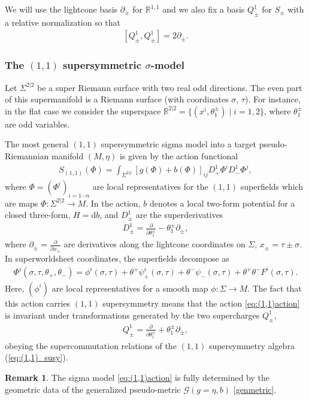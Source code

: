 \documentclass[letterpaper,12pt]{article}
\newcommand{\GG}{\mathcal{G}}
\newcommand{\RR}{\mathbb{R}}
\newcommand{\p}{\partial}
\newcommand{\rd}{\mathrm{d}}
\theoremstyle{definition}
\newtheorem{remark}[theorem]{Remark}
\theoremstyle{remark}
\theoremstyle{examples}
\begin{document}
We will use the lightcone basis $\p_{\pm}$ for $\RR^{1,1}$ and we also fix a basis $Q_\pm^1$ for $S_{\pm}$ with a relative normalization so that
\begin{align}\label{eq:(1,1)_susy}
[Q^1_\pm,Q^1_\pm] = 2\p_\pm.
\end{align}

\subsubsection{The $(1,1)$ supersymmetric $\sigma$-model} 

Let $\Sigma^{2|2}$ be a super Riemann surface with two real odd directions. 
The even part of this supermanifold is a Riemann surface (with coordinates $\sigma$, $\tau$).
For instance, in the flat case we consider the superspace $\RR^{2|2} = \{(x^i , \theta_1^{\pm}) \; | \; i = 1,2\}$, where $\theta_1^{\pm}$ are odd variables. 

The most general $(1,1)$ supersymmetric sigma model into a target pseudo-Riemannian manifold $(M,\eta)$ is given by the action functional
\begin{align}\label{eq:(1,1)action}
S_{(1,1)}(\Phi)=\int_{\Sigma^{2|2}} [g(\Phi)+b(\Phi)]_{ij}D^1_+\Phi^iD^1_-\Phi^j,
\end{align}
where $\Phi=(\Phi^i)_{i=1\cdots n}$ are local representatives for the $(1,1)$ {superfields} which are maps $\Phi: \Sigma^{2|2} \rightarrow M$.
In the action, $b$ denotes a local two-form potential for a closed three-form, $H=\rd b$, and $D^1_\pm$ are the superderivatives
\begin{align}\label{eq:D1}
D^1_\pm=\frac{\p}{\p \theta_1^\pm}-\theta_1^\pm \p_\pm,
\end{align}
where $\p_\pm=\frac{\p}{\p x_\pm}$ are derivatives along the lightcone coordinates on $\Sigma$, $x_\pm=\tau\pm\sigma$. In superworldsheet coordinates, the superfields decompose as
\begin{align}\label{fields_(1,1)}
\Phi^i(\sigma,\tau,\theta_+,\theta_-)=\phi^i(\sigma,\tau)+\theta^+\psi^i_+(\sigma,\tau)+\theta^-\psi_-(\sigma,\tau)+\theta^+\theta^-F^i(\sigma,\tau).
\end{align}
Here, $(\phi^i)$ are local representatives for a smooth map $\phi: \Sigma \rightarrow M$. The fact that this action carries $(1,1)$ supersymmetry means that the action \eqref{eq:(1,1)action} is invariant under transformations generated by the two {supercharges} $Q^1_\pm$, 
\begin{align}\label{eq:Q1}
Q^1_\pm=\frac{\p}{\p \theta_1^\pm}+\theta_1^\pm \p_\pm,
\end{align}
obeying the supercommutation relations of the $(1,1)$ supersymmetry algebra (\ref{eq:(1,1)_susy}). 
\begin{remark}
The sigma model \eqref{eq:(1,1)action} is fully determined by the geometric data of the generalized pseudo-metric $\GG(g=\eta,b)$ \eqref{genmetric}.
\end{remark}
\end{document}
